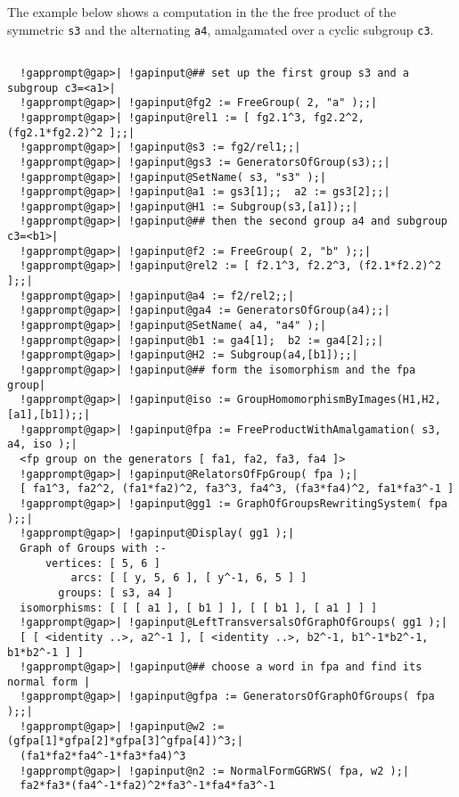 \documentclass[a4paper,11pt]{report}
\begin{document}
{{{ The example below shows a computation in the the free product of the symmetric \texttt{s3} and the alternating \texttt{a4}, amalgamated over a cyclic subgroup \texttt{c3}. 

 }

 
\begin{Verbatim}[commandchars=!@|,fontsize=\small,frame=single,label=Example]
  
  !gapprompt@gap>| !gapinput@## set up the first group s3 and a subgroup c3=<a1>|
  !gapprompt@gap>| !gapinput@fg2 := FreeGroup( 2, "a" );;|
  !gapprompt@gap>| !gapinput@rel1 := [ fg2.1^3, fg2.2^2, (fg2.1*fg2.2)^2 ];;|
  !gapprompt@gap>| !gapinput@s3 := fg2/rel1;;|
  !gapprompt@gap>| !gapinput@gs3 := GeneratorsOfGroup(s3);;|
  !gapprompt@gap>| !gapinput@SetName( s3, "s3" );|
  !gapprompt@gap>| !gapinput@a1 := gs3[1];;  a2 := gs3[2];;|
  !gapprompt@gap>| !gapinput@H1 := Subgroup(s3,[a1]);;|
  !gapprompt@gap>| !gapinput@## then the second group a4 and subgroup c3=<b1>|
  !gapprompt@gap>| !gapinput@f2 := FreeGroup( 2, "b" );;|
  !gapprompt@gap>| !gapinput@rel2 := [ f2.1^3, f2.2^3, (f2.1*f2.2)^2 ];;|
  !gapprompt@gap>| !gapinput@a4 := f2/rel2;;|
  !gapprompt@gap>| !gapinput@ga4 := GeneratorsOfGroup(a4);;|
  !gapprompt@gap>| !gapinput@SetName( a4, "a4" );|
  !gapprompt@gap>| !gapinput@b1 := ga4[1];  b2 := ga4[2];;|
  !gapprompt@gap>| !gapinput@H2 := Subgroup(a4,[b1]);;|
  !gapprompt@gap>| !gapinput@## form the isomorphism and the fpa group|
  !gapprompt@gap>| !gapinput@iso := GroupHomomorphismByImages(H1,H2,[a1],[b1]);;|
  !gapprompt@gap>| !gapinput@fpa := FreeProductWithAmalgamation( s3, a4, iso );|
  <fp group on the generators [ fa1, fa2, fa3, fa4 ]>
  !gapprompt@gap>| !gapinput@RelatorsOfFpGroup( fpa );|
  [ fa1^3, fa2^2, (fa1*fa2)^2, fa3^3, fa4^3, (fa3*fa4)^2, fa1*fa3^-1 ]
  !gapprompt@gap>| !gapinput@gg1 := GraphOfGroupsRewritingSystem( fpa );;|
  !gapprompt@gap>| !gapinput@Display( gg1 );|
  Graph of Groups with :-
      vertices: [ 5, 6 ]
          arcs: [ [ y, 5, 6 ], [ y^-1, 6, 5 ] ]
        groups: [ s3, a4 ]
  isomorphisms: [ [ [ a1 ], [ b1 ] ], [ [ b1 ], [ a1 ] ] ]
  !gapprompt@gap>| !gapinput@LeftTransversalsOfGraphOfGroups( gg1 );|
  [ [ <identity ..>, a2^-1 ], [ <identity ..>, b2^-1, b1^-1*b2^-1, b1*b2^-1 ] ]
  !gapprompt@gap>| !gapinput@## choose a word in fpa and find its normal form |
  !gapprompt@gap>| !gapinput@gfpa := GeneratorsOfGraphOfGroups( fpa );;|
  !gapprompt@gap>| !gapinput@w2 := (gfpa[1]*gfpa[2]*gfpa[3]^gfpa[4])^3;|
  (fa1*fa2*fa4^-1*fa3*fa4)^3
  !gapprompt@gap>| !gapinput@n2 := NormalFormGGRWS( fpa, w2 );|
  fa2*fa3*(fa4^-1*fa2)^2*fa3^-1*fa4*fa3^-1
  

\end{Verbatim}}}
\end{document}
